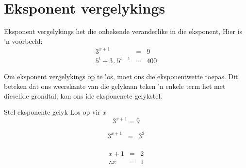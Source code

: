 \section{Eksponent vergelykings}

Eksponent vergelykings het die onbekende veranderlike in die eksponent, Hier is 'n voorbeeld:
\begin{eqnarray*}
 3^{x+1} & = & 9 \\
5^t + 3 \,.\, 5^{t-1} & = & 400
\end{eqnarray*}

Om eksponent vergelykings op te los, moet ons die eksponentwette toepas. Dit beteken dat ons weerskante van die gelykaan teken 'n enkele term het met dieselfde grondtal, kan ons ide eksponenete gelykstel.




\begin{wex}
{%
Stel eksponente gelyk
}
{%
Los op vir $x$
$$ 3^{x+1} = 9 $$
}
{%

\begin{eqnarray*}
 3^{x+1} & = & 3^2 \\
\end{eqnarray*}

\begin{eqnarray*}
 {x+1} & = & 2 \\
\therefore x & = & 1
\end{eqnarray*}
}
\end{wex}




